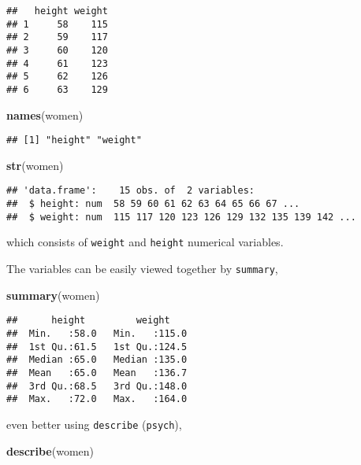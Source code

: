 \documentclass[]{book}
\newenvironment{Shaded}{\begin{snugshade}}{\end{snugshade}}
\newcommand{\KeywordTok}[1]{\textcolor[rgb]{0.13,0.29,0.53}{\textbf{{#1}}}}
\newcommand{\NormalTok}[1]{{#1}}
\theoremstyle{definition}
\theoremstyle{definition}
\theoremstyle{remark}
\begin{document}
\begin{verbatim}
##   height weight
## 1     58    115
## 2     59    117
## 3     60    120
## 4     61    123
## 5     62    126
## 6     63    129
\end{verbatim}

\begin{Shaded}
\begin{Highlighting}[]
\KeywordTok{names}\NormalTok{(women)}
\end{Highlighting}
\end{Shaded}

\begin{verbatim}
## [1] "height" "weight"
\end{verbatim}

\begin{Shaded}
\begin{Highlighting}[]
\KeywordTok{str}\NormalTok{(women)}
\end{Highlighting}
\end{Shaded}

\begin{verbatim}
## 'data.frame':    15 obs. of  2 variables:
##  $ height: num  58 59 60 61 62 63 64 65 66 67 ...
##  $ weight: num  115 117 120 123 126 129 132 135 139 142 ...
\end{verbatim}

which consists of \texttt{weight} and \texttt{height} numerical
variables.

The variables can be easily viewed together by \texttt{summary},

\begin{Shaded}
\begin{Highlighting}[]
\KeywordTok{summary}\NormalTok{(women)}
\end{Highlighting}
\end{Shaded}

\begin{verbatim}
##      height         weight     
##  Min.   :58.0   Min.   :115.0  
##  1st Qu.:61.5   1st Qu.:124.5  
##  Median :65.0   Median :135.0  
##  Mean   :65.0   Mean   :136.7  
##  3rd Qu.:68.5   3rd Qu.:148.0  
##  Max.   :72.0   Max.   :164.0
\end{verbatim}

even better using \texttt{describe} (\texttt{psych}),

\begin{Shaded}
\begin{Highlighting}[]
\KeywordTok{describe}\NormalTok{(women)}
\end{Highlighting}
\end{Shaded}
\end{document}
